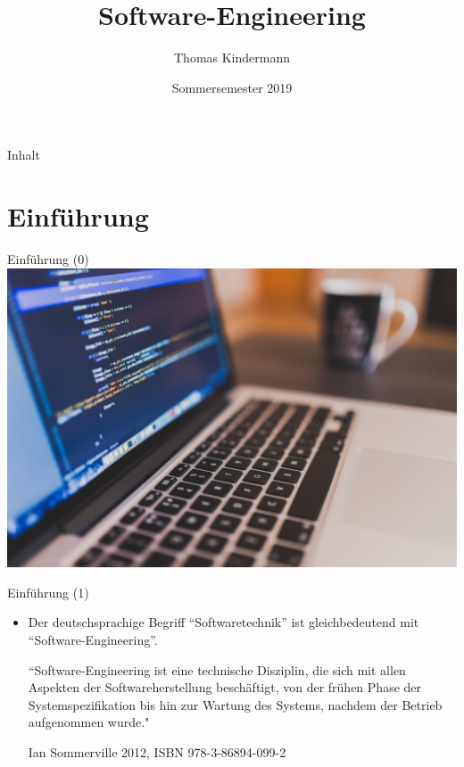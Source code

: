 \documentclass[aspectratio=169]{beamer}
\title[Your Short Title]{Software-Engineering}
\author{Thomas Kindermann}
\institute{HSRW}
\date{Sommersemester 2019}
\begin{document}
\begin{frame}
  \titlepage
\end{frame}

\begin{frame}{Inhalt}
  \tableofcontents
\end{frame}

\section{Einführung}
\begin{frame}{Einführung (0)}
\includegraphics[scale=0.25]{pexels-photo_development.jpg}
\end{frame}

\begin{frame}{Einführung (1)}
\begin{itemize}
  \item Der deutschsprachige Begriff “Softwaretechnik” ist gleichbedeutend mit “Software-Engineering”.

“Software-Engineering ist eine technische Disziplin, die sich mit allen Aspekten der Softwareherstellung beschäftigt, von der frühen Phase der Systemspezifikation bis hin zur Wartung des Systems, nachdem der Betrieb aufgenommen wurde."

Ian Sommerville 2012, ISBN 978-3-86894-099-2
\end{itemize}
\end{frame}
\end{document}
